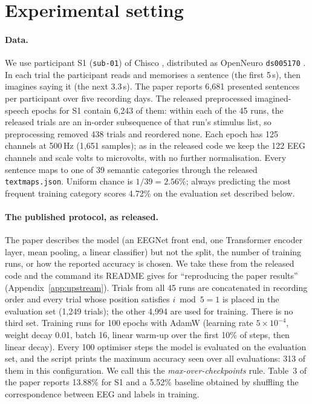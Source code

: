 \section{Experimental setting}
\label{sec:setting}

\paragraph{Data.}
We use participant S1 (\texttt{sub-01}) of Chisco \citep{zhang2024chisco}, distributed as OpenNeuro
\texttt{ds005170} \citep{ds005170}. In each trial the participant reads and memorises a sentence (the first 5\,s), then imagines
saying it (the next 3.3\,s). The paper reports 6{,}681 presented sentences per
participant over five recording days. The released preprocessed imagined-speech epochs for S1
contain 6{,}243 of them: within each of the 45 runs, the released trials are an in-order subsequence
of that run's stimulus list, so preprocessing removed 438 trials and reordered none. Each epoch has
125 channels at 500\,Hz (1{,}651 samples); as in the released code we keep the 122 EEG channels and
scale volts to microvolts, with no further normalisation. Every sentence maps to one of 39 semantic
categories through the released \texttt{textmaps.json}. Uniform chance is $1/39 = 2.56\%$; always
predicting the most frequent training category scores 4.72\% on the evaluation set described below.

\paragraph{The published protocol, as released.}
The paper describes the model (an EEGNet front end, one Transformer encoder layer, mean pooling,
a linear classifier) but not the split, the number of training runs, or how the reported accuracy is
chosen. We take these from the released code \citep{chiscocode} and the command its README gives
for ``reproducing the paper results'' (Appendix~\ref{app:upstream}). Trials from all 45 runs are
concatenated in recording order and every trial whose position satisfies $i \bmod 5 = 1$ is placed in
the evaluation set (1{,}249 trials); the other 4{,}994 are used for training. There is no third set.
Training runs for 100 epochs with AdamW (learning rate $5\times10^{-4}$, weight decay 0.01, batch 16,
linear warm-up over the first 10\% of steps, then linear decay). Every 100 optimiser steps the model
is evaluated on the evaluation set, and the script prints the maximum accuracy seen over all
evaluations: 313 of them in this configuration. We call this the \emph{max-over-checkpoints} rule.
Table~3 of the paper reports 13.88\% for S1 and a 5.52\% baseline obtained by shuffling the
correspondence between EEG and labels in training.

